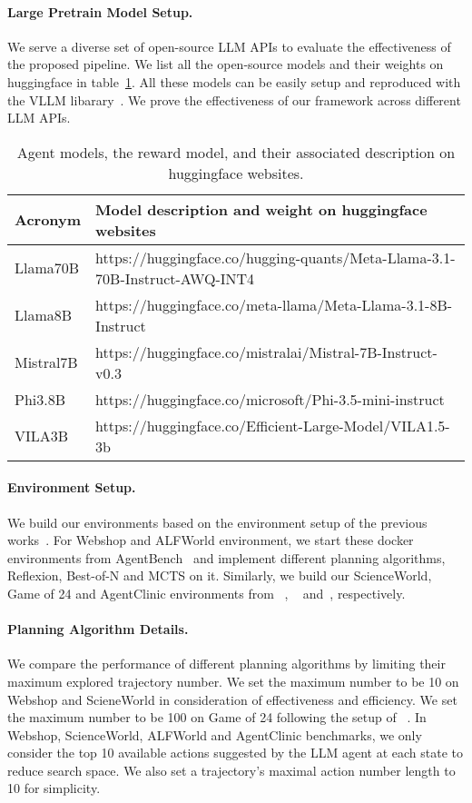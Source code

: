 \paragraph{Large Pretrain Model Setup.} We serve a diverse set of open-source LLM APIs to evaluate the effectiveness of the proposed pipeline. We list all the open-source models and their weights on huggingface in table~\ref{tab:llmapi}. All these models can be easily setup and reproduced with the VLLM libarary~\citep{kwon2023efficient}. We prove the effectiveness of our \Model framework across different LLM APIs.
\begin{table}[ht]
    \centering
    \begin{tabular}{l|l}
    \toprule
         Acronym & Model description and weight on huggingface websites \\
         \midrule
         Llama70B & https://huggingface.co/hugging-quants/Meta-Llama-3.1-70B-Instruct-AWQ-INT4 \\
         Llama8B  & https://huggingface.co/meta-llama/Meta-Llama-3.1-8B-Instruct \\
         Mistral7B & https://huggingface.co/mistralai/Mistral-7B-Instruct-v0.3  \\
         Phi3.8B & https://huggingface.co/microsoft/Phi-3.5-mini-instruct \\ 
    \midrule
        VILA3B & https://huggingface.co/Efficient-Large-Model/VILA1.5-3b \\
    \bottomrule
    \end{tabular}
    \caption{Agent models, the reward model, and their associated description on huggingface websites.}
    \label{tab:llmapi}
\end{table}
\paragraph{Environment Setup.} We build our environments based on the environment setup of the previous works~\citep{liu2023agentbench,song2024trial,yao2023treethoughtsdeliberateproblem,ALFWorld20,schmidgall2024agentclinic}. For Webshop and ALFWorld environment, we start these docker environments from AgentBench~\citep{liu2023agentbench} and implement different planning algorithms, Reflexion, Best-of-N and MCTS on it. Similarly, we build our ScienceWorld, Game of 24 and AgentClinic environments from ~\cite{song2024trial}, ~\cite{yao2023treethoughtsdeliberateproblem} and~\cite{schmidgall2024agentclinic}, respectively. 
\paragraph{Planning Algorithm Details.} We compare the performance of different planning algorithms by limiting their maximum explored trajectory number. We set the maximum number to be 10 on Webshop and ScieneWorld in consideration of effectiveness and efficiency. We set the maximum number to be 100 on Game of 24 following the setup of ~\cite{yao2023treethoughtsdeliberateproblem}. In Webshop, ScienceWorld, ALFWorld and AgentClinic benchmarks, we only consider the top 10 available actions suggested by the LLM agent at each state to reduce search space. We also set a trajectory's maximal action number length to 10 for simplicity. 

